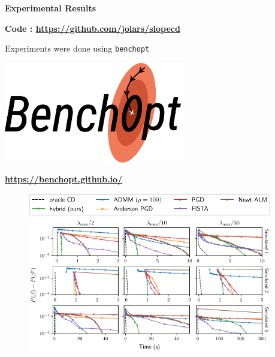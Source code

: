 \documentclass[english,final,t]{beamer}
\begin{document}
\begin{frame}{}
\begin{columns}[t]
\begin{column}{.3\linewidth}
\begin{block}{\textbf{\color{malgared}{\# 3 Anderson Acceleration}}}
		\end{block}
	\end{column}
	\begin{column}{.3\linewidth}
		\begin{block}{\textbf{\color{malgared}Experimental Results}}
			\begin{center}
					\begin{minipage}{0.9\linewidth}
					\begin{beamerboxesrounded}[lower=headerCol]{}
						\textbf{Code : \url{https://github.com/jolars/slopecd}}
					\end{beamerboxesrounded}
				\end{minipage}
			\end{center}
			Experiments were done using \texttt{benchopt}
			\begin{center}
				\begin{minipage}{0.48\linewidth}
				\centering
				\includegraphics[width=300px]{images/benchopt_logo_black_path}
				\begin{beamerboxesrounded}[lower=headerCol]{}
					\textbf{\url{https://benchopt.github.io/}}
				\end{beamerboxesrounded}
			\end{minipage}
			\end{center}
			\begin{figure}[tb]
				\includegraphics[width=0.7\linewidth]{./images/simulated_legend.pdf}
				\includegraphics[width=0.8\linewidth]{./images/simulated.pdf}


\end{figure}
\end{block}
\end{column}
\end{columns}
\end{frame}
\end{document}
